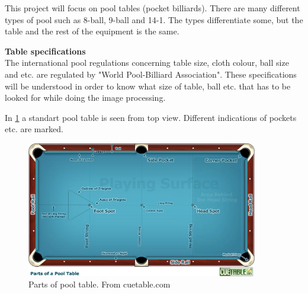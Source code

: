 This project will focus on pool tables (pocket billiards). There are many different types of pool such as 8-ball, 9-ball and 14-1. The types differentiate some, but the table and the rest of the equipment is the same. 

\textbf{Table specifications}\\
The international pool regulations concerning table size, cloth colour, ball size and etc. are regulated by "World Pool-Billiard Association". These specifications will be understood in order to know what size of table, ball etc. that has to be looked for while doing the image processing.

In \ref{fig:partspool} a standart pool table is seen from top view. Different indications of pockets etc. are marked.

\begin{figure}[H]
\begin{center}
\leavevmode
\includegraphics[width=0.9\textwidth]{images/pooltablespecs.jpg}
\end{center}
\caption{Parts of pool table. From cuetable.com}
\label{fig:partspool}
\end{figure}

